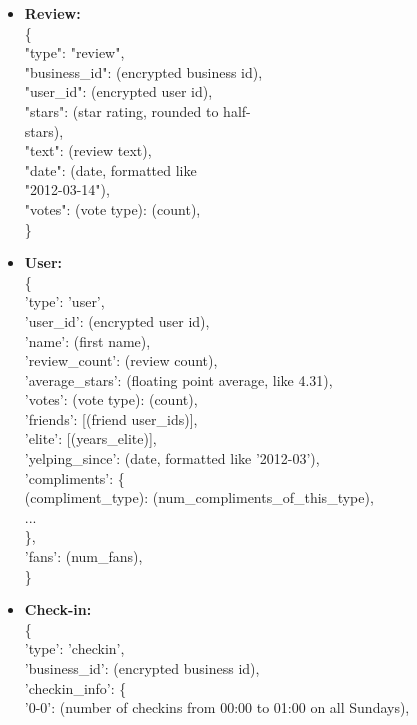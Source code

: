 \documentclass{article}
\newcommand\tab[1][1cm]{\hspace*{#1}}
\begin{document}
\begin{itemize}
\item \textbf{Review:}
\\ \{
\\ \tab     "type": "review",
\\ \tab     "business\_id": (encrypted business id),
\\ \tab     "user\_id": (encrypted user id),
\\ \tab     "stars": (star rating, rounded to half-
\\ \tab         stars),
\\ \tab     "text": (review text),
\\ \tab     "date": (date, formatted like
\\ \tab         "2012-03-14"),
\\ \tab     "votes": {(vote type): (count)},
\\ \tab \}
\item \textbf{User:} \hfill 
\\	\{
\\ \tab	    'type': 'user',
\\ \tab	    'user\_id': (encrypted user id),
\\ \tab	    'name': (first name),
\\ \tab	    'review\_count': (review count),
\\ \tab	    'average\_stars': (floating point average, like 4.31),
\\ \tab	    'votes': {(vote type): (count)},
\\ \tab	    'friends': [(friend user\_ids)],
\\ \tab	    'elite': [(years\_elite)],
\\ \tab	    'yelping\_since': (date, formatted like '2012-03'),
\\ \tab	    'compliments': \{
\\ \tab	        (compliment\_type): (num\_compliments\_of\_this\_type),
\\ \tab	        ...
\\ \tab	    \},
\\ \tab	    'fans': (num\_fans),
\\ \}
\item \textbf{Check-in:} \hfill \\ \{
\\ \tab	    'type': 'checkin',
\\ \tab	    'business\_id': (encrypted business id),
\\ \tab	    'checkin\_info': \{
\\ \tab	        '0-0': (number of checkins from 00:00 to 01:00 on all Sundays),

\end{itemize}
\end{document}
